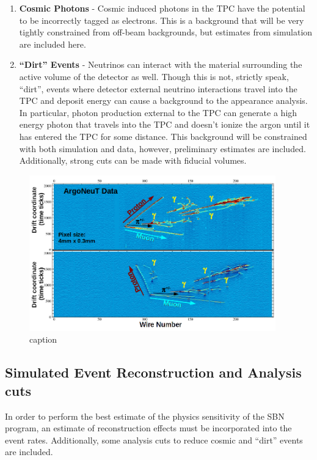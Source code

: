 \begin{enumerate}
  \item {\bf Cosmic Photons} - Cosmic induced photons in the TPC have the potential to be incorrectly tagged as electrons. This is a background that will be very tightly constrained from off-beam backgrounds, but estimates from simulation are included here.

  \item{\bf ``Dirt'' Events} - Neutrinos can interact with the material surrounding the active volume of the detector as well.  Though this is not, strictly speak, ``dirt'', events where detector external neutrino interactions travel into the TPC and deposit energy can cause a background to the \nue appearance analysis.  In particular, photon production external to the TPC can generate a high energy photon that travels into the TPC and doesn't ionize the argon until it has entered the TPC for some distance.  This background will be constrained with both simulation and data, however, preliminary estimates are included.  Additionally, strong cuts can be made with fiducial volumes.

\end{enumerate}

\begin{figure}[htbp]
  \centering
  \includegraphics[width=0.95\textwidth]{sbn_figures/ArgoNeuT_Labels.png}
  \caption{caption}
  \label{fig:argo_pi0}
\end{figure}

\subsection{Simulated Event Reconstruction and Analysis cuts}
\label{subsection:event_reco}

In order to perform the best estimate of the physics sensitivity of the SBN program, an estimate of reconstruction effects must be incorporated into the event rates.  Additionally, some analysis cuts to reduce cosmic and ``dirt'' events are included.


